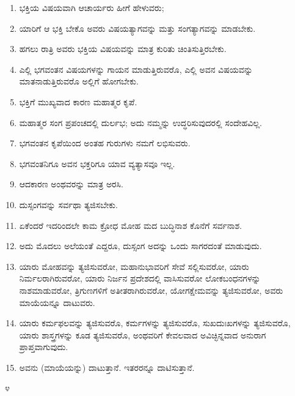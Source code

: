 \begin{enumerate}
\item ಭಕ್ತಿಯ ವಿಷಯವಾಗಿ ಆಚಾರ್ಯರು ಹೀಗೆ ಹೇಳುವರು;

 \item ಯಾರಿಗೆ ಆ ಭಕ್ತಿ ಬೇಕೊ ಅವರು ವಿಷಯತ್ಯಾಗವನ್ನು ಮತ್ತು ಸಂಗತ್ಯಾಗವನ್ನು ಮಾಡಬೇಕು.

 \item ಹಗಲು ರಾತ್ರಿ ಅವರು ಭಕ್ತಿಯ ವಿಷಯವನ್ನು ಮಾತ್ರ ಕುರಿತು ಚಿಂತಿಸುತ್ತಿರಬೇಕು.

 \item ಎಲ್ಲಿ ಭಗವಂತನ ವಿಷಯಗಳನ್ನು ಗಾಯನ ಮಾಡುತ್ತಿರುವರೊ, ಎಲ್ಲಿ ಅವನ ವಿಷಯವನ್ನು ಮಾತನಾಡುತ್ತಿರುವರೊ ಅಲ್ಲಿಗೆ ಹೋಗಬೇಕು.

 \item ಭಕ್ತಿಗೆ ಮುಖ್ಯವಾದ ಕಾರಣ ಮಹಾತ್ಮರ ಕೃಪೆ.

 \item ಮಹಾತ್ಮರ ಸಂಗ ಪ್ರಪಂಚದಲ್ಲಿ ದುರ್ಲಭ; ಅದು ನಮ್ಮನ್ನು ಉದ್ಧರಿಸುವುದರಲ್ಲಿ ಸಂದೇಹವಿಲ್ಲ.

 \item ಭಗವಂತನ ಕೃಪೆಯಿಂದ ಅಂತಹ ಗುರುಗಳು ನಮಗೆ ಲಭಿಸುವರು.

 \item ಭಗವಂತನಿಗೂ ಅವನ ಭಕ್ತರಿಗೂ ಯಾವ ವ್ಯತ್ಯಾಸವೂ ಇಲ್ಲ.

 \item ಆದಕಾರಣ ಅಂಥವರನ್ನು ಮಾತ್ರ ಅರಸಿ.

 \item ದುಸ್ಸಂಗವನ್ನು ಸರ್ವಥಾ ತ್ಯಜಿಸಬೇಕು.

 \item ಏಕೆಂದರೆ ಇದರಿಂದಲೇ ಕಾಮ ಕ್ರೋಧ ಮೋಹ ಮದ ಬುದ್ಧಿನಾಶ ಕೊನೆಗೆ ಸರ್ವನಾಶ.

 \item ಅದು ಮೊದಲು ಅಲೆಯಂತೆ ಎದ್ದರೂ, ದುಸ್ಸಂಗ ಅದನ್ನು ಒಂದು ಸಾಗರದಂತೆ ಮಾಡುವುದು.

 \item ಯಾರು ಮೋಹವನ್ನು ತ್ಯಜಿಸುವರೋ, ಮಹಾನುಭಾವರಿಗೆ ಸೇವೆ ಸಲ್ಲಿಸುವರೋ, ಯಾರು ನಿರ್ಮಲರಾಗಿರುವರೋ, ಯಾರು ನಿರ್ಜನ ಪ್ರದೇಶದಲ್ಲಿ ವಾಸಿಸುವರೋ ಲೋಕಬಂಧನಗಳನ್ನು ನಾಶಮಾಡುವರೋ, ತ್ರಿಗುಣಗಳಿಗೆ ಅತೀತರಾಗಿರುವರೋ, ಯೋಗಕ್ಷೇಮವನ್ನು ತ್ಯಜಿಸುವರೋ, ಅವರು ಮಾಯೆಯನ್ನೂ ದಾಟುವರು.

 \item ಯಾರು ಕರ್ಮಫಲವನ್ನು ತ್ಯಜಿಸುವರೊ, ಕರ್ಮಗಳನ್ನು ತ್ಯಜಿಸುವರೊ, ಸುಖದುಃಖಗಳನ್ನು ತ್ಯಜಿಸುವರೊ, ಯಾರು ಶಾಸ್ತ್ರಗಳನ್ನು ಕೂಡ ತ್ಯಜಿಸುವರೊ, ಅಂಥವರಿಗೆ ಕೇವಲವಾದ ಅವಿಚ್ಛಿನ್ನವಾದ ಅನುರಾಗ ಪ್ರಾಪ್ತವಾಗುವುದು.

 \item ಅವನು (ಮಾಯೆಯನ್ನು) ದಾಟುತ್ತಾನೆ. ಇತರರನ್ನೂ ದಾಟಿಸುತ್ತಾನೆ.

\end{enumerate}

\begin{center}
೪
\end{center}

